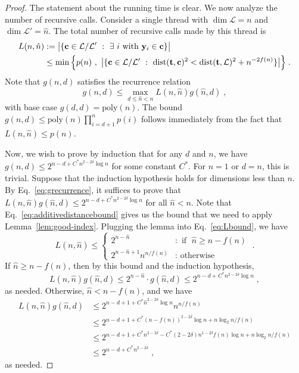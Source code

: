 \documentclass[11pt]{article}
\renewcommand{\vec}[1]{\ensuremath{\mathbf{#1}}}
\newcommand{\poly}{\mathrm{poly}}
\newcommand{\lat}{\mathcal{L}}
\DeclareMathOperator{\dist}{dist}
\DeclarePairedDelimiter\set{\{}{\}}
\begin{document}
\begin{proof}
The statement about the running time is clear. We now analyze the number of recursive calls. Consider a single thread with $\dim \lat = n$ and $\dim \lat' = \hat{n}$. The total number of recursive calls made by this thread is
\begin{align}
L(n, \hat{n}) &:= \big| \set{ \vec{c} \in \lat/\lat'\ :\ \exists\ i \text{ with } \vec{y}_{i} \in \vec{c}} \big| \nonumber \\
&\leq 
\min \Big\{ p(n)\ ,\ 
\big| \set{ \vec{c} \in \lat/\lat'\ :\ \dist(\vec{t}, \vec{c})^2 <\dist(\vec{t}, \lat)^2 + n^{-2f(n)}} \big| 
\Big\}
\label{eq:Lbound}
\; .
\end{align}
Note that $g(n,d)$ satisfies the recurrence relation
\begin{equation}
g(n, d) \le \max_{d \leq \hat{n} < n} L(n, \hat{n}) g(\hat{n},d) 
\; ,
\label{eq:grecurrence}
\end{equation}
with base case $g(d,d) = \poly(n)$.
The bound $g(n,d) \leq \poly(n) \prod_{i=d+1}^n p(i)$ follows immediately from the fact that $L(n,\hat{n}) \leq p(n)$.

Now, we wish to prove by induction that for any $d$ and $n$, we have $g(n,d) \leq 2^{n-d+C^*n^{2 - 2\delta}\log n}$ for some constant $C^*$. For $n=1$ or $d=n$, this is trivial. Suppose that the induction hypothesis holds for dimensions less than $n$. 
By Eq.~\eqref{eq:grecurrence}, it suffices to prove that $L(n, \hat{n}) g(\hat{n},d) \leq 2^{n-d+C^*n^{2 - 2\delta}\log n}$ for all $\hat{n} < n$. Note that Eq.~\eqref{eq:additivedistancebound} gives us the bound that we need to apply Lemma~\ref{lem:good-index}. Plugging the lemma into Eq.~\eqref{eq:Lbound}, we have 
\[
L(n, \hat{n}) \leq 
\begin{cases} 2^{n-\hat{n}}
&:  \text{ if }\; \hat{n} \geq n-f(n)  \\ 
2^{n-\hat{n}+1}n^{n/f(n)}
&: \text{ otherwise} \end{cases}
\; .
\]
If $\hat{n} \geq n-f(n)$, then by this bound and the induction hypothesis,
\[
L(n, \hat{n}) g(\hat{n},d)  \leq 2^{n-\hat{n}} \cdot g(\hat{n},d) \leq 2^{n-d+C^* n^{2-2\delta} \log n}
\; ,
\]
as needed. Otherwise, $\hat{n} < n-f(n)$, and we have
\begin{align*}
L(n, \hat{n}) g(\hat{n},d) 
&\leq 2^{n-d+1 + C^* \hat{n}^{2-2\delta}\log n}n^{n/f(n)}\\
&\leq 2^{n-d+1 + C^* (n-f(n))^{2-2\delta}\log n + n\log_2 n/f(n)}\\
&\leq 2^{n-d+1 + C^* n^{2-2\delta} - C^*(2-2\delta) n^{1-2\delta}f(n)\log n + n\log_2 n/f(n)}\\
&\leq 2^{n-d + C^* n^{2-2\delta}}
\; ,
\end{align*}
as needed.
\end{proof}
\end{document}
